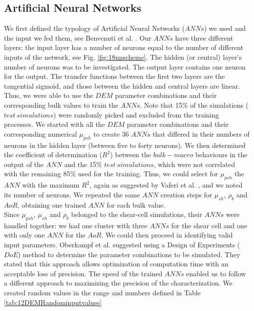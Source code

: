 \documentclass{llncs}
\begin{document}
\subsection{Artificial Neural Networks}
\label{subsec:ann}
We first defined the typology of Artificial Neural Networks ($ANNs$) we used and
the input we fed them, see Benvenuti et al. \cite{RefWorks:180}.
Our $ANNs$ have three different layers: the input layer has a number of neurons
equal to the number of different inputs of the network, see Fig. \ref{fig:18nnscheme}.
The hidden (or central) layer's number of neurons was to be investigated. 
The output layer contains one neuron for the output.
The transfer functions between the first two layers are the tangential sigmoid, 
and those between the hidden and central layers are linear.\\
Thus, we were able to use the $DEM$ parameter combinations and their
corresponding bulk values to train the $ANNs$.
Note that 15\% of the simulations ($test ~ simulations$) were
randomly picked and excluded from the training processes.
We started with all the $DEM$ parameter combinations and their corresponding
numerical $\mu_{psh}$ to create 36 $ANNs$ that differed in their numbers of
neurons in the hidden layer (between five to forty neurons).
We then determined the coefficient of determination ($R^2$) between the
$bulk-macro$ behaviours in the output of the $ANN$ and the 15\% $test ~ simulations$, 
which were not correlated with the remaining 85\% used for the training. 
Thus, we could select for $\mu_{psh}$ the $ANN$ with the maximum $R^2$, 
again as suggested by Vaferi et al. \cite{RefWorks:150}, and we noted its number
of neurons.
We repeated the same $ANN$ creation steps for $\mu_{sh}$, $\rho_b$
and $AoR$, obtaining one trained $ANN$ for each bulk value. \\
Since $\mu_{psh}$, $\mu_{sh}$ and $\rho_b$ belonged to the shear-cell
simulations, their $ANNs$ were handled together: we had one cluster with three 
$ANNs$ for the shear cell and one with only one $ANN$ for the $AoR$.
We could then proceed in identifying valid input parameters.
Oberkampf et al. \cite{RefWorks:160} suggested using a Design of Experiments
($DoE$) method to determine the parameter combinations to be simulated.
They stated that this approach allows optimization of computation time
with an acceptable loss of precision.
The speed of the trained $ANNs$ enabled us to follow a different approach to
maximizing the precision of the characterization.
We created random values
in the range and numbers defined in Table \ref{tab:12DEMRandominputvalues}
\end{document}
